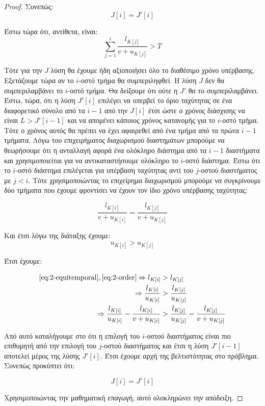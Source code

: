\documentclass[11pt,a4paper]{book}
\begin{document}
\begin{proof}
Συνεπώς:
\[
J[ i ] = J'[ i ]
\]

Έστω τώρα ότι, αντίθετα, είναι:
\[
\sum_{j=1}^{i} \frac{l_{K[ j ]}}{v + u_{K[ j ]}} > T
\]

Τότε για την $J$ λύση θα έχουμε ήδη αξιοποιήσει όλο το διαθέσιμο χρόνο υπέρβασης. Εξετάζουμε τώρα αν το $i$-οστό τμήμα θα συμπεριληφθεί. Η λύση $J$ δεν θα συμπεριλαμβάνει το $i$-οστό τμήμα. Θα δείξουμε ότι ούτε η $J'$ θα το συμπεριλαμβάνει. Έστω, τώρα, ότι η λύση $J'[ i ]$ επιλέγει να υπερβεί το όριο ταχύτητας σε ένα διαφορετικό σύνολο από τα $i - 1$ από την $J[ i ]$ έτσι ώστε ο χρόνος διάσχισης να είναι $L > J'[ i - 1 ]$ και να απομένει κάποιος χρόνος κατανομής για το $i$-οστό τμήμα. Τότε ο χρόνος αυτός θα πρέπει να έχει αφαιρεθεί από ένα τμήμα από τα πρώτα $i - 1$ τμήματα. Λόγω του επιχειρήματος διαχωρισμού διαστημάτων μπορούμε να θεωρήσουμε ότι η ανταλλαγή αφορά ένα ολόκληρο διάστημα από τα $i - 1$ διαστήματα και χρησιμοποιείται για να αντικαταστήσουμε ολόκληρο το $i$-οστό διάστημα. Έστω ότι το $i$-οστό διάστημα επιλέγεται για υπέρβαση ταχύτητας αντί του $j$-οστού διαστήματος με $j < i$. Τότε χρησιμοποιώντας το επιχείρημα διαχωρισμού μπορούμε να συγκρίνουμε δύο τμήματα που έχουμε φροντίσει να έχουν τον ίδιο χρόνο υπέρβασης ταχύτητας:

\begin{equation} \label{eq:2-equitemporal}
\frac{l_{K[ i ]}}{v + u_{K[ i ]}} = \frac{l_{K[ j ]}}{v + u_{K[ j ]}}
\end{equation}

Και έτσι λόγω της διάταξης έχουμε:
\begin{equation} \label{eq:2-order}
{u_{K[ i ]}} > {u_{K[ j ]}}
\end{equation}

Έτσι έχουμε:

\begin{align*}
\ref{eq:2-equitemporal}, \ref{eq:2-order} \Rightarrow l_{K[ i ]} & > l_{K[ j ]} \\
\Rightarrow \frac{l_{K[ i ]}}{u_{K[ i ]}} & > \frac{l_{K[ j ]}}{u_{K[ j ]}} \\
\Rightarrow \frac{l_{K[ i ]}}{u_{K[ i ]}} - \frac{l_{K[ i ]}}{v + u_{K[ i ]}} & > \frac{l_{K[ j ]}}{u_{K[ j ]}} - \frac{l_{K[ j ]}}{v + u_{K[ j ]}}
\end{align*}

Από αυτό καταλήγουμε στο ότι η επιλογή του $i$-οστού διαστήματος είναι πιο επιθυμητή από την επιλογή του $j$-οστού διαστήματος και έτσι η λύση $J'[ i - 1 ]$ αποτελεί μέρος της λύσης $J'[ i ]$. Έτσι έχουμε αρχή της βελτιστότητας στο πρόβλημα. Συνεπώς προκύπτει ότι:

\[
J[ i ] = J'[ i ]
\]

Χρησιμοποιώντας την μαθηματική επαγωγή, αυτό ολοκληρώνει την απόδειξη.
\end{proof}
\end{document}
